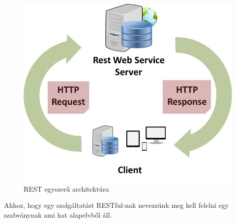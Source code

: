 \begin{figure}[!ht]
	\includegraphics[width=150mm, keepaspectratio]{figures/rest_structure.jpeg}
	\caption{REST egyszerű architektúra}
	\label{fig:rest_structure}
\end{figure}

Ahhoz, hogy egy szolgáltatást RESTful-nak nevezzünk meg kell felelni egy szabványnak ami hat alapelvből áll.

